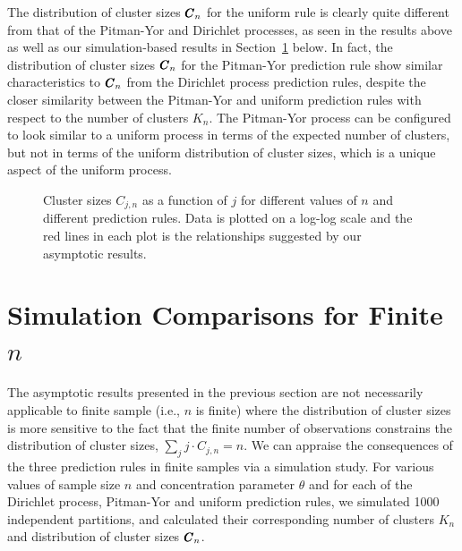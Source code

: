 \documentclass[]{article}
\begin{document}
The distribution of cluster sizes $\pmb{C}_n$ for the uniform rule is
clearly quite different from that of the Pitman-Yor and Dirichlet
processes, as seen in the results above as well as our simulation-based
results in Section~\ref{simulationstudy} below.  In fact, the
distribution of cluster sizes $\pmb{C}_n$ for the Pitman-Yor prediction
rule show similar characteristics to $\pmb{C}_n$ from the Dirichlet
process prediction rules, despite the closer similarity between the
Pitman-Yor and uniform prediction rules with respect to the number of
clusters $K_n$.  The Pitman-Yor process
can be configured to look similar to a uniform process in terms of the
expected number of clusters, but not in terms of the uniform
distribution of cluster sizes, which is a unique aspect of the uniform
process.

\begin{figure}[ht]
\begin{center}
\end{center}
\caption{Cluster sizes $C_{j,n}$ as a function of
  $j$ for different values of $n$ and different prediction rules.   Data is plotted on a log-log
  scale and the red lines in each plot is the relationships suggested
  by our asymptotic results.}\label{simclustersizes}
\end{figure}

\section{Simulation Comparisons for Finite $n$}\label{simulationstudy}

The asymptotic results presented in the previous section are not
necessarily applicable to finite sample (i.e., $n$ is finite)
where the distribution of cluster sizes is more sensitive to the fact
that the finite number of observations constrains the distribution of
cluster sizes, $\sum_{j} j \cdot C_{j,n} = n$.  We can appraise the
consequences of the three prediction rules in finite samples via a
simulation study.  For various values of sample size $n$ and concentration parameter $\theta$ and for each
of the Dirichlet process, Pitman-Yor and uniform prediction rules, we simulated 1000 independent partitions, and
calculated their corresponding number of clusters $K_n$ and
distribution of cluster sizes $\pmb{C}_n$.
\end{document}
